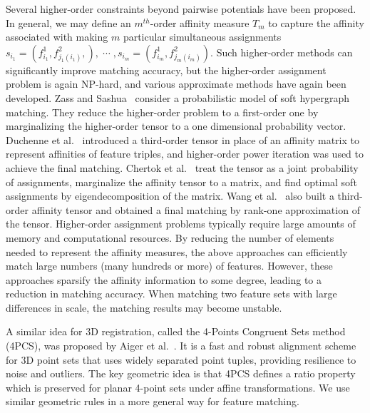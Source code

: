 Several higher-order constraints beyond pairwise potentials
have been proposed.
In general, we may define an $m^{th}$-order affinity measure $T_m$ to capture the affinity associated with making $m$ particular simultaneous assignments $s_{i_1}=(f_{i_1}^1,f_{j_1(i_1)}^2,),\; \cdots \;,s_{i_m}=(f_{i_m}^1,f_{j_m(i_m)}^2)$.
Such higher-order methods can significantly improve matching accuracy, 
but the higher-order assignment problem is again NP-hard, and various approximate methods have again been developed.
Zass and Sashua~\cite{Zass08} consider a probabilistic model of soft hypergraph matching.
They reduce the higher-order problem to a first-order one by marginalizing the higher-order tensor to a one dimensional probability vector.
Duchenne et al.~\cite{Duchenne_etal09} introduced a third-order tensor in place of an affinity matrix to represent affinities of feature triples,
and higher-order power iteration was used to achieve the final matching.
Chertok et al.~\cite{Chertok10} treat the tensor as a joint probability of assignments, marginalize the affinity tensor to a matrix,
and find optimal soft assignments by eigendecomposition of the matrix.
Wang et al.~\cite{Aiping10} also built a third-order affinity tensor and obtained a final matching by rank-one approximation of the tensor.
Higher-order assignment problems typically require large amounts of memory and computational resources.
By reducing the number of elements needed to represent the affinity measures,
the above approaches can efficiently match large numbers (many hundreds or more) of features.
However, these approaches sparsify the affinity information to some degree, leading to a reduction in matching accuracy.
When matching two feature sets with large differences in scale, the matching results may become unstable.

A similar idea for 3D registration, called the 4-Points Congruent Sets method (4PCS), was proposed by Aiger et al.~\cite{Aiger08}. 
It is a fast and robust alignment scheme for 3D point sets that uses widely separated point tuples, providing resilience to noise and outliers.
The key geometric idea is that 4PCS defines a ratio property which is preserved for planar 4-point sets under affine transformations.
We use similar geometric rules in a more general way for feature matching.

